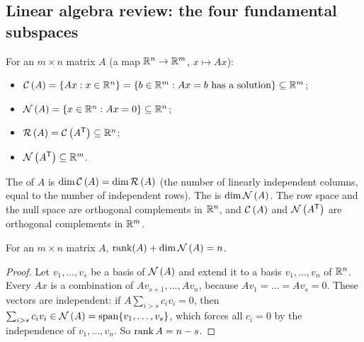 \subsection{Linear algebra review: the four fundamental subspaces}
For an $m\times n$ matrix $A$ (a map $\mathbb R^n\to\mathbb R^m$, $x\mapsto Ax$):
\begin{itemize}
  \item {} $\mathcal{C}\left(A\right)=\{Ax:x\in\mathbb R^n\}=\{b\in\mathbb R^m:Ax=b\text{ has a solution}\}\subseteq\mathbb R^m$;
  \item {} $\mathcal{N}\left(A\right)=\{x\in\mathbb R^n:Ax=0\}\subseteq\mathbb R^n$;
  \item {} $\mathcal{R}\left(A\right)=\mathcal{C}\left(A^{\mathsf T}\right)\subseteq\mathbb R^n$;
  \item {} $\mathcal{N}\left(A^{\mathsf T}\right)\subseteq\mathbb R^m$.
\end{itemize}
The  of $A$ is $\dim\mathcal{C}\left(A\right)=\dim\mathcal{R}\left(A\right)$ (the number of linearly independent columns, equal to the number of independent
rows). The  is $\dim\mathcal{N}\left(A\right)$. The row space and the null space are orthogonal complements in $\mathbb R^n$, and $\mathcal{C}\left(A\right)$ and
$\mathcal{N}\left(A^{\mathsf T}\right)$ are orthogonal complements in $\mathbb R^m$.

\begin{theorem}\label{thm:L14-ranknullity}
For an $m\times n$ matrix $A$, $\operatorname{rank}(A)+\dim\mathcal{N}\left(A\right)=n$.
\end{theorem}
\begin{proof}
Let $v_1,\dots,v_s$ be a basis of $\mathcal{N}\left(A\right)$ and extend it to a basis $v_1,\dots,v_n$ of $\mathbb R^n$. Every $Ax$ is a combination of
$Av_{s+1},\dots,Av_n$, because $Av_1=\dots=Av_s=0$. These vectors are independent: if $A\sum_{i>s}c_iv_i=0$, then
$\sum_{i>s}c_iv_i\in\mathcal{N}\left(A\right)=\mathrm{span}\{v_1,\dots,v_s\}$, which forces all $c_i=0$ by the independence of $v_1,\dots,v_n$. So
$\operatorname{rank} A=n-s$.
\end{proof}


